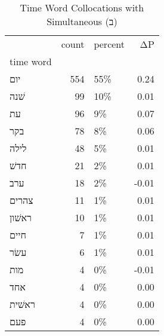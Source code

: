 \begin{table}[htbp!]
\centering
\caption{Time Word Collocations with Simultaneous (ב)}
\label{table:simב_head_cpd}
\begin{tabular}{lrlr}
\toprule
{} &  count & percent &    ΔP \\
time word &        &         &       \\
\midrule
יום       &    554 &     55\% &  0.24 \\
שׁנה      &     99 &     10\% &  0.01 \\
עת        &     96 &      9\% &  0.07 \\
בקר       &     78 &      8\% &  0.06 \\
לילה      &     48 &      5\% &  0.01 \\
חדשׁ      &     21 &      2\% &  0.01 \\
ערב       &     18 &      2\% & -0.01 \\
צהרים     &     11 &      1\% &  0.01 \\
ראשׁון    &     10 &      1\% &  0.01 \\
חיים      &      7 &      1\% &  0.01 \\
עשׂר      &      6 &      1\% &  0.01 \\
מות       &      4 &      0\% & -0.01 \\
אחד       &      4 &      0\% &  0.00 \\
ראשׁית    &      4 &      0\% &  0.00 \\
פעם       &      4 &      0\% &  0.00 \\
\bottomrule
\end{tabular}
\end{table}
